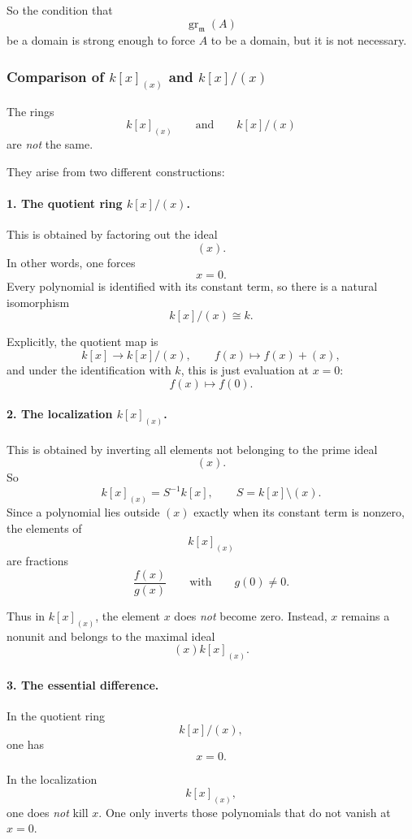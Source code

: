 \documentclass[12pt,a4paper]{article}
\theoremstyle{notespace}
\theoremstyle{definition}
\begin{document}
So the condition that
\[
\operatorname{gr}_{\mathfrak m}(A)
\]
be a domain is strong enough to force \(A\) to be a domain, but it is not necessary.

\subsubsection{Comparison of \(k[x]_{(x)}\) and \(k[x]/(x)\)}

The rings
\[
k[x]_{(x)}
\qquad\text{and}\qquad
k[x]/(x)
\]
are \emph{not} the same.

They arise from two different constructions:

\paragraph{1. The quotient ring \(k[x]/(x)\).}

This is obtained by factoring out the ideal
\[
(x).
\]
In other words, one forces
\[
x=0.
\]
Every polynomial is identified with its constant term, so there is a natural isomorphism
\[
k[x]/(x)\cong k.
\]

Explicitly, the quotient map is
\[
k[x]\longrightarrow k[x]/(x),
\qquad
f(x)\longmapsto f(x)+(x),
\]
and under the identification with \(k\), this is just evaluation at \(x=0\):
\[
f(x)\longmapsto f(0).
\]

\paragraph{2. The localization \(k[x]_{(x)}\).}

This is obtained by inverting all elements not belonging to the prime ideal
\[
(x).
\]
So
\[
k[x]_{(x)}=S^{-1}k[x],
\qquad
S=k[x]\setminus (x).
\]
Since a polynomial lies outside \((x)\) exactly when its constant term is nonzero, the elements of
\[
k[x]_{(x)}
\]
are fractions
\[
\frac{f(x)}{g(x)}
\qquad\text{with}\qquad g(0)\neq 0.
\]

Thus in \(k[x]_{(x)}\), the element \(x\) does \emph{not} become zero. Instead, \(x\) remains a nonunit and belongs to the maximal ideal
\[
(x)k[x]_{(x)}.
\]

\paragraph{3. The essential difference.}

In the quotient ring
\[
k[x]/(x),
\]
one has
\[
x=0.
\]

In the localization
\[
k[x]_{(x)},
\]
one does \emph{not} kill \(x\). One only inverts those polynomials that do not vanish at \(x=0\).
\end{document}
